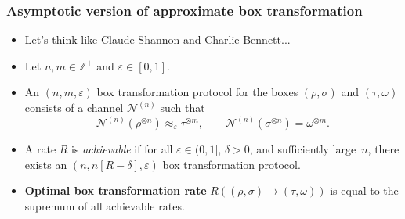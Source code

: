 \documentclass[usenames,dvipsnames,handout]{beamer}
\begin{document}
\begin{frame}
\frametitle{Asymptotic version of approximate box transformation}

\begin{itemize}

\pause
\item Let's think like Claude Shannon and Charlie Bennett... 


\pause
\vspace{.1in}
\item Let $n,m\in\mathbb{Z}^{+}$ and $\varepsilon\in\left[  0,1\right]
$.

\pause
\vspace{.1in}
\item An $(n,m,\varepsilon)$ box transformation protocol for the boxes
$(\rho,\sigma)$ and $(\tau,\omega)$ consists of a channel $\mathcal{N}^{(n)}$
such that
$$
\mathcal{N}^{(n)}(\rho^{\otimes n})  \approx_{\varepsilon}%
\tau^{\otimes m},\qquad
\mathcal{N}^{(n)}(\sigma^{\otimes n})  =\omega^{\otimes
m}.
$$

\pause
\vspace{.1in}
\item
A rate $R$ is \textit{achievable} if for all $\varepsilon\in(0,1]$,
$\delta>0$, and sufficiently large~$n$, there exists an $(n,n[R-\delta
],\varepsilon)$ box transformation protocol.

\pause
\vspace{.1in}
\item {\color{MidnightBlue}\textbf{Optimal box transformation
rate}} $R((\rho,\sigma)\rightarrow(\tau,\omega))$ is equal to the supremum
of all achievable rates.

\end{itemize}

\end{frame}
\end{document}
